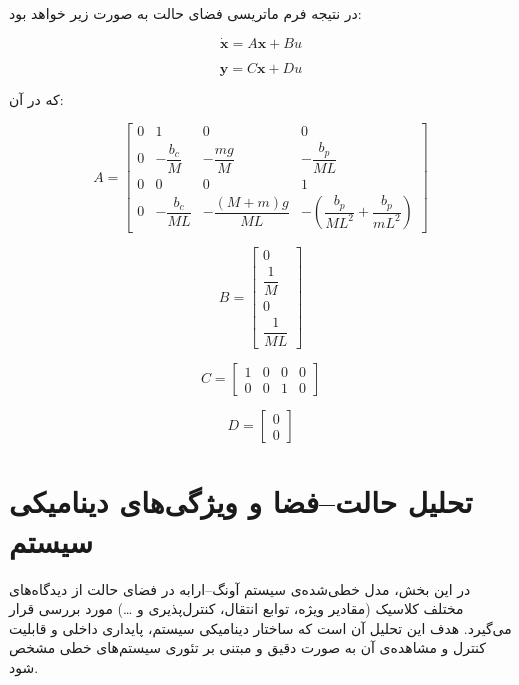 \documentclass[a4paper,12pt]{article}
\begin{document}
در نتیجه فرم ماتریسی فضای حالت به صورت زیر خواهد بود:

\[
    \dot{\mathbf{x}}
    =
    A\mathbf{x}
    +
    B u
\]

\[
    \mathbf{y}
    =
    C\mathbf{x}
    +
    D u
\]

که در آن:

\[
    A =
    \begin{bmatrix}
        0                   & 1                & 0              & 0                \\
        0                   & -\dfrac{b_c}{M}  & -\dfrac{mg}{M} & -\dfrac{b_p}{ML} \\
        0                   & 0                & 0              & 1                \\
        0                   & -\dfrac{b_c}{ML} &
        -\dfrac{(M+m)g}{ML} &
        -\left(
        \dfrac{b_p}{ML^2}
        +
        \dfrac{b_p}{mL^2}
        \right)
    \end{bmatrix}
\]

\[
    B =
    \begin{bmatrix}
        0            \\
        \dfrac{1}{M} \\
        0            \\
        \dfrac{1}{ML}
    \end{bmatrix}
\]

\[
    C =
    \begin{bmatrix}
        1 & 0 & 0 & 0 \\
        0 & 0 & 1 & 0
    \end{bmatrix}
\]

\[
    D =
    \begin{bmatrix}
        0 \\
        0
    \end{bmatrix}
\]

\section{تحلیل حالت--فضا و ویژگی‌های دینامیکی سیستم}
\label{sec:ss_analysis}

در این بخش، مدل خطی‌شده‌ی سیستم آونگ--ارابه در فضای حالت
از دیدگاه‌های مختلف کلاسیک (مقادیر ویژه، توابع انتقال، کنترل‌پذیری و \ldots)
مورد بررسی قرار می‌گیرد.
هدف این تحلیل آن است که
ساختار دینامیکی سیستم، پایداری داخلی و قابلیت کنترل و مشاهده‌ی آن
به صورت دقیق و مبتنی بر تئوری سیستم‌های خطی مشخص شود.

\end{document}
